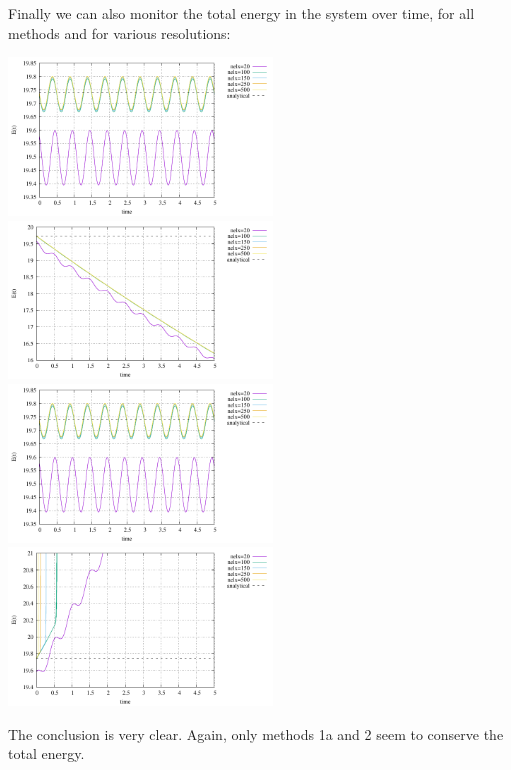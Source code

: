 Finally we can also monitor the total energy in the system over time, for all 
methods and for various resolutions:
\begin{center}
\includegraphics[width=7cm]{python_codes/fieldstone_164/results1/energy_meth1a.pdf}
\includegraphics[width=7cm]{python_codes/fieldstone_164/results1/energy_meth1b.pdf}\\
\includegraphics[width=7cm]{python_codes/fieldstone_164/results1/energy_meth2.pdf}
\includegraphics[width=7cm]{python_codes/fieldstone_164/results1/energy_meth3.pdf}
\end{center}

The conclusion is very clear. Again, only methods 1a and 2 seem to conserve
the total energy.

